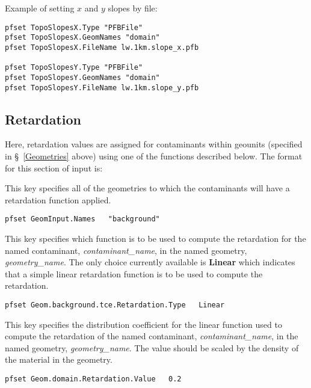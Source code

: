 Example of setting $x$ and $y$ slopes by file:
\begin{display}\begin{verbatim}
pfset TopoSlopesX.Type "PFBFile"
pfset TopoSlopesX.GeomNames "domain"
pfset TopoSlopesX.FileName lw.1km.slope_x.pfb

pfset TopoSlopesY.Type "PFBFile"
pfset TopoSlopesY.GeomNames "domain"
pfset TopoSlopesY.FileName lw.1km.slope_y.pfb
\end{verbatim}\end{display}


\subsection{Retardation}
\label{Retardation}

Here, retardation values are assigned for contaminants within
geounits (specified in \S~\ref{Geometries} above) using one of
the functions described below.  The format for this section of
input is:

{
This key specifies all of the geometries to which the contaminants will
have a retardation function applied.
}
\begin{display}\begin{verbatim}
pfset GeomInput.Names   "background"
\end{verbatim}\end{display}

{
This key specifies which function is to be used to compute the
retardation for the named contaminant, {\em contaminant\_name}, in the
named geometry, {\em geometry\_name}.  The only choice currently
available is {\bf Linear} which indicates that a simple linear
retardation function is to be used to compute the retardation.
}
\begin{display}\begin{verbatim}
pfset Geom.background.tce.Retardation.Type   Linear
\end{verbatim}\end{display}

{
This key specifies the distribution coefficient for the linear function
used to compute the retardation of the named contaminant,
{\em contaminant\_name}, in the named geometry, {\em geometry\_name}.
The value should be scaled by the density of the material in the
geometry.
}
\begin{display}\begin{verbatim}
pfset Geom.domain.Retardation.Value   0.2
\end{verbatim}\end{display}

